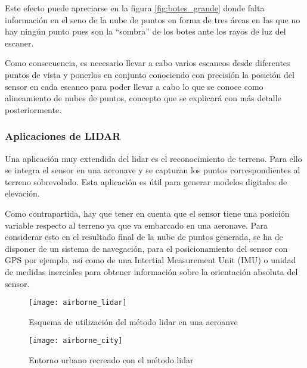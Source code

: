 Este efecto puede apreciarse en la figura \ref{fig:botes_grande} donde falta información en el seno de la nube de puntos en forma de tres áreas en las que no hay ningún punto pues son la ``sombra'' de los botes ante los rayos de luz del escaner.

Como consecuencia, es necesario llevar a cabo varios escaneos desde diferentes puntos de vista y
ponerlos en conjunto conociendo con precisión la posición del sensor en cada escaneo para poder llevar a cabo lo que se conoce como alineamiento de nubes de puntos, concepto que se explicará con más detalle posteriormente.


\subsubsection{Aplicaciones de LIDAR}

Una aplicación muy extendida del lidar es el reconocimiento de terreno. Para ello se integra el sensor en una aeronave y se capturan los puntos correspondientes al terreno sobrevolado. Esta aplicación es útil para generar modelos digitales de elevación.

Como contrapartida, hay que tener en cuenta que el sensor tiene una posición variable respecto al terreno ya que va embarcado en una aeronave. Para considerar esto en el resultado final de la nube de puntos generada, se ha de disponer de un sistema de navegación, para el posicionamiento del sensor con GPS por ejemplo, así como de una Intertial Measurement Unit (IMU) o unidad de medidas inerciales para obtener información sobre la orientación absoluta del sensor.

 
\begin{figure}
  \texttt{[image: airborne\_lidar]}
  \caption{Esquema de utilización del método lidar en una aeroanve}\label{fig:airborne_lidar}
\endminipage\hfill
{}
  \texttt{[image: airborne\_city]}
  \caption{Entorno urbano recreado con el método lidar}\label{fig:airborne_city}
\endminipage\hfill

\end{figure}







